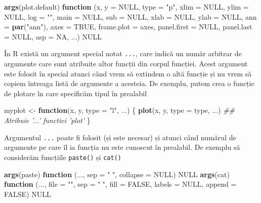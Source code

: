 \documentclass[]{article}
\newenvironment{Shaded}{\begin{snugshade}}{\end{snugshade}}
\newcommand{\CommentTok}[1]{\textcolor[rgb]{0.56,0.35,0.01}{\textit{#1}}}
\newcommand{\ControlFlowTok}[1]{\textcolor[rgb]{0.13,0.29,0.53}{\textbf{#1}}}
\newcommand{\DataTypeTok}[1]{\textcolor[rgb]{0.13,0.29,0.53}{#1}}
\newcommand{\KeywordTok}[1]{\textcolor[rgb]{0.13,0.29,0.53}{\textbf{#1}}}
\newcommand{\NormalTok}[1]{#1}
\newcommand{\OtherTok}[1]{\textcolor[rgb]{0.56,0.35,0.01}{#1}}
\newcommand{\StringTok}[1]{\textcolor[rgb]{0.31,0.60,0.02}{#1}}
\begin{document}
\begin{Shaded}
\begin{Highlighting}[]
\KeywordTok{args}\NormalTok{(plot.default)}
\ControlFlowTok{function}\NormalTok{ (x, }\DataTypeTok{y =} \OtherTok{NULL}\NormalTok{, }\DataTypeTok{type =} \StringTok{"p"}\NormalTok{, }\DataTypeTok{xlim =} \OtherTok{NULL}\NormalTok{, }\DataTypeTok{ylim =} \OtherTok{NULL}\NormalTok{, }
    \DataTypeTok{log =} \StringTok{""}\NormalTok{, }\DataTypeTok{main =} \OtherTok{NULL}\NormalTok{, }\DataTypeTok{sub =} \OtherTok{NULL}\NormalTok{, }\DataTypeTok{xlab =} \OtherTok{NULL}\NormalTok{, }\DataTypeTok{ylab =} \OtherTok{NULL}\NormalTok{, }
    \DataTypeTok{ann =} \KeywordTok{par}\NormalTok{(}\StringTok{"ann"}\NormalTok{), }\DataTypeTok{axes =} \OtherTok{TRUE}\NormalTok{, }\DataTypeTok{frame.plot =}\NormalTok{ axes, }\DataTypeTok{panel.first =} \OtherTok{NULL}\NormalTok{, }
    \DataTypeTok{panel.last =} \OtherTok{NULL}\NormalTok{, }\DataTypeTok{asp =} \OtherTok{NA}\NormalTok{, ...) }
\OtherTok{NULL}
\end{Highlighting}
\end{Shaded}

În R există un argument special notat \texttt{...}, care indică un număr
arbitrar de argumente care sunt atribuite altor funcții din corpul
funcției. Acest argument este folosit în special atunci când vrem să
extindem o altă funcție și nu vrem să copiem întreaga listă de argumente
a acesteia. De exemplu, putem crea o funcție de plotare în care
specificăm tipul în prealabil

\begin{Shaded}
\begin{Highlighting}[]
\NormalTok{myplot <-}\StringTok{ }\ControlFlowTok{function}\NormalTok{(x, y, }\DataTypeTok{type =} \StringTok{"l"}\NormalTok{, ...) \{}
        \KeywordTok{plot}\NormalTok{(x, y, }\DataTypeTok{type =}\NormalTok{ type, ...)         }\CommentTok{## Atribuie '...' functiei 'plot'}
\NormalTok{\}}
\end{Highlighting}
\end{Shaded}

Argumentul \texttt{...} poate fi folosit (și este necesar) și atunci
când numărul de argumente pe care îl ia funcția nu este cunoscut în
prealabil. De exemplu să considerăm funcțiile \texttt{paste()} și
\texttt{cat()}

\begin{Shaded}
\begin{Highlighting}[]
\KeywordTok{args}\NormalTok{(paste)}
\ControlFlowTok{function}\NormalTok{ (..., }\DataTypeTok{sep =} \StringTok{" "}\NormalTok{, }\DataTypeTok{collapse =} \OtherTok{NULL}\NormalTok{) }
\OtherTok{NULL}
\KeywordTok{args}\NormalTok{(cat)}
\ControlFlowTok{function}\NormalTok{ (..., }\DataTypeTok{file =} \StringTok{""}\NormalTok{, }\DataTypeTok{sep =} \StringTok{" "}\NormalTok{, }\DataTypeTok{fill =} \OtherTok{FALSE}\NormalTok{, }\DataTypeTok{labels =} \OtherTok{NULL}\NormalTok{, }
    \DataTypeTok{append =} \OtherTok{FALSE}\NormalTok{) }
\OtherTok{NULL}
\end{Highlighting}
\end{Shaded}
\end{document}
